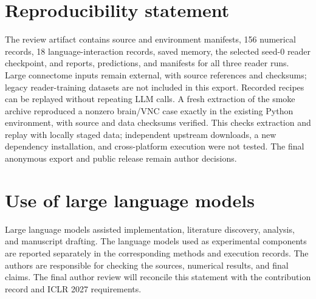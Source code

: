 \documentclass{article}
\begin{document}
\section*{Reproducibility statement}
The review artifact contains source and environment manifests, 156 numerical records, 18 language-interaction records, saved memory, the selected seed-0 reader checkpoint, and reports, predictions, and manifests for all three reader runs. Large connectome inputs remain external, with source references and checksums; legacy reader-training datasets are not included in this export. Recorded recipes can be replayed without repeating LLM calls. A fresh extraction of the smoke archive reproduced a nonzero brain/VNC case exactly in the existing Python environment, with source and data checksums verified. This checks extraction and replay with locally staged data; independent upstream downloads, a new dependency installation, and cross-platform execution were not tested. The final anonymous export and public release remain author decisions.
\section*{Use of large language models}
Large language models assisted implementation, literature discovery, analysis, and manuscript drafting. The language models used as experimental components are reported separately in the corresponding methods and execution records. The authors are responsible for checking the sources, numerical results, and final claims. The final author review will reconcile this statement with the contribution record and ICLR 2027 requirements.


\appendix


\clearpage

\end{document}
